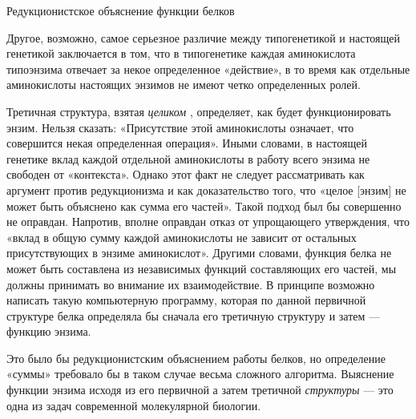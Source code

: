 \documentclass[../main.tex]{subfiles}
\begin{document}
Редукционистское объяснение функции белков

Другое, возможно, самое серьезное различие между типогенетикой и настоящей генетикой заключается в том, что в типогенетике каждая аминокислота типоэнзима отвечает за некое определенное «действие», в то время как отдельные аминокислоты настоящих энзимов не имеют четко определенных ролей.

Третичная структура, взятая \emph{целиком} , определяет, как будет функционировать энзим. Нельзя сказать: «Присутствие этой аминокислоты означает, что совершится некая определенная операция». Иными словами, в настоящей генетике вклад каждой отдельной аминокислоты в работу всего энзима не свободен от «контекста». Однако этот факт не следует рассматривать как аргумент против редукционизма и как доказательство того, что «целое {[}энзим{]} не может быть объяснено как сумма его частей». Такой подход был бы совершенно не оправдан. Напротив, вполне оправдан отказ от упрощающего утверждения, что «вклад в общую сумму каждой аминокислоты не зависит от остальных присутствующих в энзиме аминокислот». Другими словами, функция белка не может быть составлена из независимых функций составляющих его частей, мы должны принимать во внимание их взаимодействие. В принципе возможно написать такую компьютерную программу, которая по данной первичной структуре белка определяла бы сначала его третичную структуру и затем --- функцию энзима.

Это было бы редукционистским объяснением работы белков, но определение «суммы» требовало бы в таком случае весьма сложного алгоритма. Выяснение функции энзима исходя из его первичной а затем третичной \emph{структуры} --- это одна из задач современной молекулярной биологии.
\end{document}
